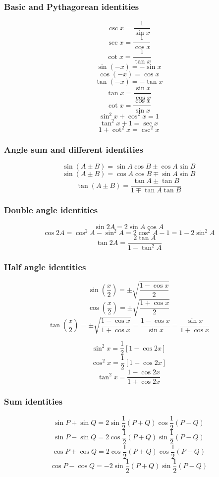 \documentclass[11pt]{article}
\begin{document}
\subsubsection{Basic and Pythagorean identities}
\label{sec:orgb3c01cc}
\[\csc x = \frac{1}{\sin x}\]
\[\sec x = \frac{1}{\cos x}\]
\[\cot x = \frac{1}{\tan x}\]
\[\sin (-x) = - \sin x\]
\[\cos (-x) = \cos x\]
\[\tan (-x) = - \tan x\]
\[\tan x = \frac{\sin x}{\cos x}\]
\[\cot x = \frac{\cos x}{\sin x}\]
\[\sin^2 x + \cos^2 x = 1\]
\[\tan^2 x + 1 = \sec x\]
\[1 + \cot^2 x = \csc^2 x\]

\subsubsection{Angle sum and different identities}
\label{sec:org7be8952}
\[\sin(A \pm B) = \sin A \cos B \pm \cos A \sin B\]
\[\sin(A \pm B) = \cos A \cos B \mp \sin A \sin B\]
\[\tan(A \pm B) = \frac{\tan A \pm \tan B}{1 \mp \tan A \tan B}\]

\subsubsection{Double angle identities}
\label{sec:org90d27f2}
\[\sin 2A = 2 \sin A \cos A\]
\[\cos 2A = \cos^2 A - \sin^2 A = 2 \cos^2 A - 1 = 1 - 2 \sin^2 A\]
\[\tan 2A = \frac{2 \tan A}{1 - \tan^2 A}\]

\subsubsection{Half angle identities}
\label{sec:orgd6c2bd1}
\[\sin \left(\frac{x}{2} \right) = \pm \sqrt{\frac{1 - \cos x}{2}}\]
\[\cos \left(\frac{x}{2} \right) = \pm \sqrt{\frac{1 + \cos x}{2}}\]
\[\tan \left(\frac{x}{2} \right) = \pm \sqrt{\frac{1 - \cos x}{1 + \cos x}} = \frac{1 - \cos x}{\sin x} = \frac{\sin x}{1 + \cos x}\]

\[\sin^2 x = \frac{1}{2} \left[1 - \cos 2x \right]\]
\[\cos^2 x = \frac{1}{2} \left[1 + \cos 2x \right]\]
\[\tan^2 x = \frac{1 - \cos 2x}{1 + \cos 2x}\]

\subsubsection{Sum identities}
\label{sec:orge6fbe70}
\[\sin P + \sin Q = 2 \sin \frac{1}{2}(P + Q) \cos \frac{1}{2}(P - Q)\]
\[\sin P - \sin Q = 2 \cos \frac{1}{2}(P + Q) \sin \frac{1}{2}(P - Q)\]
\[\cos P + \cos Q = 2 \cos \frac{1}{2}(P + Q) \cos \frac{1}{2}(P - Q)\]
\[\cos P - \cos Q = - 2 \sin \frac{1}{2}(P + Q) \sin \frac{1}{2}(P - Q)\]
\end{document}
